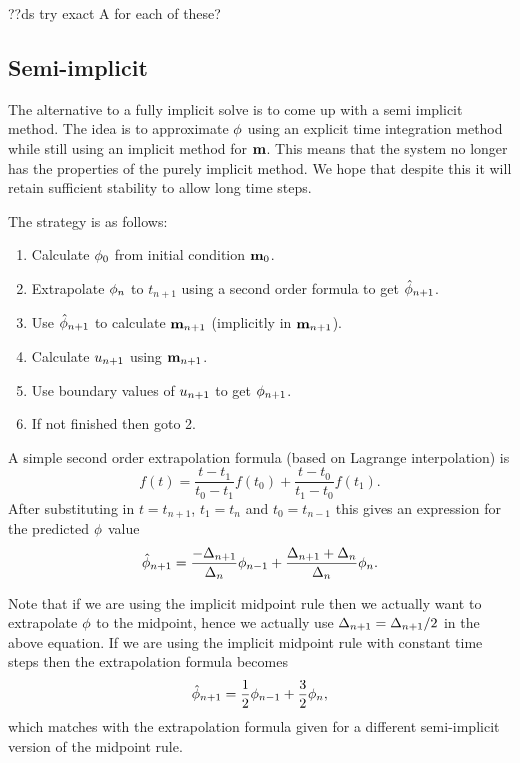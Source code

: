 ??ds try exact A for each of these?


\subsection{Semi-implicit}
\label{sec:semi-implicit-bem}

The alternative to a fully implicit solve is to come up with a semi implicit method.
The idea is to approximate $\phi$ using an explicit time integration method while still using an implicit method for $\mathbf{m}$.
This means that the system no longer has the properties of the purely implicit method.
We hope that despite this it will retain sufficient stability to allow long time steps.

The strategy is as follows:
\begin{enumerate}
\item Calculate $\phi_0$ from initial condition $\mathbf{m}_0$.
\item Extrapolate $\phi_n$ to $t_{n+1}$ using a second order formula to get $\hat{\phi}_{n+1}$.
\item Use $\hat{\phi}_{n+1}$ to calculate $\mathbf{m}_{n+1}$ (implicitly in $\mathbf{m}_{n+1}$).
\item Calculate $u_{n+1}$ using $\mathbf{m}_{n+1}$.
\item Use boundary values of $u_{n+1}$ to get $\phi_{n+1}$.
\item If not finished then goto 2.
\end{enumerate}

A simple second order extrapolation formula (based on Lagrange interpolation\cite[pg. 312]{Kincaid2002}) is 
\begin{equation}
  \label{eq:65}
  f(t) = \frac{t - t_1}{t_0 - t_1}f(t_0) + \frac{t - t_0}{t_1 - t_0}f(t_1).
\end{equation}
After substituting in $t=t_{n+1}$, $t_1=t_n$ and $t_0=t_{n-1}$ this gives an expression for the predicted $\phi$ value
\begin{equation}
  \label{eq:66}
  \hat{\phi}_{n+1} = \frac{-\Delta_{n+1}}{\Delta_{n}} \phi_{n-1} + \frac{\Delta_{n+1} + \Delta_{n}}{\Delta_{n}} \phi_n.
\end{equation}

Note that if we are using the implicit midpoint rule then we actually want to extrapolate $\phi$ to the midpoint, hence we actually use $\Delta_{n+1} = \Delta_{n+1} /2$ in the above equation.
If we are using the implicit midpoint rule with constant time steps then the extrapolation formula becomes
\begin{equation}
  \label{eq:67}
  \hat{\phi}_{n+1} = \frac{1}{2} \phi_{n-1} + \frac{3}{2} \phi_n,
\end{equation}
which matches with the extrapolation formula given for a different semi-implicit version of the midpoint rule\cite{Serpico2001}.

